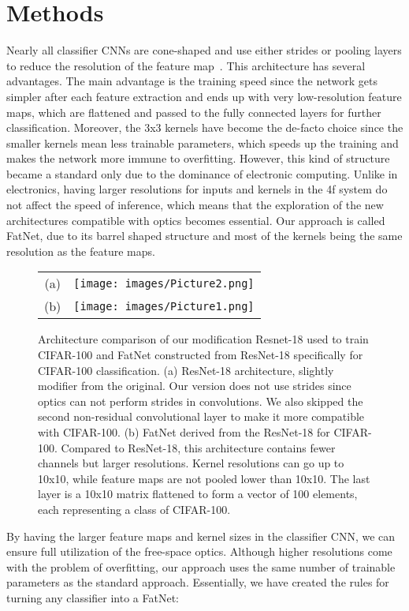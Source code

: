 \documentclass{article}
\begin{document}
\section{Methods}
Nearly all classifier CNNs are cone-shaped and use either strides or pooling layers to reduce the resolution of the feature map~\cite{peng_large_2017}. This architecture has several advantages. The main advantage is the training speed since the network gets simpler after each feature extraction and ends up with very low-resolution feature maps, which are flattened and passed to the fully connected layers for further classification. Moreover, the 3x3 kernels have become the de-facto choice since the smaller kernels mean less trainable parameters, which speeds up the training and makes the network more immune to overfitting. However, this kind of structure became a standard only due to the dominance of electronic computing. Unlike in electronics, having larger resolutions for inputs and kernels in the 4f system do not affect the speed of inference, which means that the exploration of the new architectures compatible with optics becomes essential. Our approach is called FatNet, due to its barrel shaped structure and most of the kernels being the same resolution as the feature maps.

\begin{figure}[H]
    \centering
    \begin{tabular}{cc}
    (a)     &          \texttt{[image: images/Picture2.png]}\\
    (b)     &         \texttt{[image: images/Picture1.png]}
    \end{tabular}
    \caption{Architecture comparison of our modification Resnet-18 used to train CIFAR-100 and FatNet constructed from ResNet-18 specifically for CIFAR-100 classification. (a) ResNet-18 architecture, slightly modifier from the original. Our version does not use strides since optics can not perform strides in convolutions. We also skipped the second non-residual convolutional layer to make it more compatible with CIFAR-100. (b) FatNet derived from the ResNet-18 for CIFAR-100. Compared to ResNet-18, this architecture contains fewer channels but larger resolutions. Kernel resolutions can go up to 10x10, while feature maps are not pooled lower than 10x10. The last layer is a 10x10 matrix flattened to form a vector of 100 elements, each representing a class of CIFAR-100.\label{fig:architecture}}
\end{figure}  

By having the larger feature maps and kernel sizes in the classifier CNN, we can ensure full utilization of the free-space optics. Although higher resolutions come with the problem of overfitting, our approach uses the same number of trainable parameters as the standard approach. Essentially, we have created the rules for turning any classifier into a FatNet:
\end{document}
